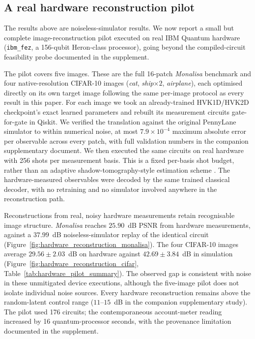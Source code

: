 \documentclass[pdflatex,sn-basic]{sn-jnl}
\begin{document}
\subsection{A real hardware reconstruction pilot}
\label{sec:hardware_pilot}

The results above are noiseless-simulator results. We now report a small but
complete image-reconstruction pilot executed on real IBM Quantum hardware
(\texttt{ibm\_fez}, a 156-qubit Heron-class processor), going beyond the
compiled-circuit feasibility probe documented in the supplement.

The pilot covers five images. These are the full 16-patch \textit{Monalisa}
benchmark and four native-resolution CIFAR-10 images (\textit{cat},
\textit{ship}$\times2$, \textit{airplane}), each optimised directly on its own
target image following the same per-image protocol as every result in this
paper. For each image we took an already-trained HVK1D/HVK2D checkpoint's exact
learned parameters and rebuilt its measurement circuits gate-for-gate in Qiskit.
We verified the translation against the original PennyLane simulator to within
numerical noise, at most $7.9\times10^{-4}$ maximum absolute error per
observable across every patch, with full validation numbers in the companion
supplementary document. We then executed the same circuits on real hardware with
256 shots per measurement basis. This is a fixed per-basis shot budget, rather
than an adaptive shadow-tomography-style estimation scheme
\citep{Huang2020Shadows}. The hardware-measured observables were decoded by the
same trained classical decoder, with no retraining and no simulator involved
anywhere in the reconstruction path.

Reconstructions from real, noisy hardware measurements retain recognisable image
structure. \textit{Monalisa} reaches $25.90$~dB PSNR from hardware measurements,
against a $37.99$~dB noiseless-simulator replay of the identical circuit
(Figure~\ref{fig:hardware_reconstruction_monalisa}). The four CIFAR-10 images
average $29.56\pm2.03$~dB on hardware against $42.69\pm3.84$~dB in simulation
(Figure~\ref{fig:hardware_reconstruction_cifar},
Table~\ref{tab:hardware_pilot_summary}). The observed gap is consistent with
noise in these unmitigated device executions, although the five-image pilot does
not isolate individual noise sources. Every hardware reconstruction remains above
the random-latent control range ($11$--$15$~dB in the companion supplementary
study). The pilot used 176 circuits; the contemporaneous account-meter reading
increased by 16 quantum-processor seconds, with the provenance limitation
documented in the supplement.
\end{document}
